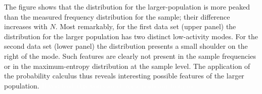 \documentclass[\ifafour a4paper,12pt,\else a5paper,10pt,\fi%
onecolumn,oneside,article,%
british%
]{memoir}
\theoremstyle{remark}
\theoremstyle{innote}
\renewcommand*{\|}{\nonscript\,\vert\nonscript\;\mathopen{}}
\begin{document}
The figure shows that the distribution for the larger-population is more
peaked than the measured frequency distribution for the sample; their
difference increases with $N$. Most remarkably, for the first data set
(upper panel) the distribution for the larger population has two distinct
low-activity modes. For the second data set (lower panel) the distribution
presents a small shoulder on the right of the mode.
Such features are clearly not present in the sample frequencies or in the
maximum-entropy distribution at the sample level. The application of the
probability calculus thus reveals interesting possible features of the larger
population. \textcolor{white}{If you find this you can claim a postcard from
  us.}
\end{document}
